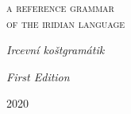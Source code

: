 \begin{titlepage}
        \centering
        \vspace{4\baselineskip}
        {\huge\scshape
        a reference grammar\\of the iridian language\par}
        \vspace{\baselineskip}
        {\Large\itshape Ircevní koštgramátik}

        \vfill
        {\em First Edition}\par
        {2020}
\end{titlepage}